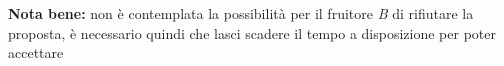 \begin{minipage}{\textwidth}
{            %

        }
        \vspace{0.5cm}
    \textbf{Nota bene:} non è contemplata la possibilità per il fruitore \textit{B}
    di rifiutare la proposta, è necessario quindi che lasci scadere il tempo
    a disposizione per poter accettare
\end{minipage}